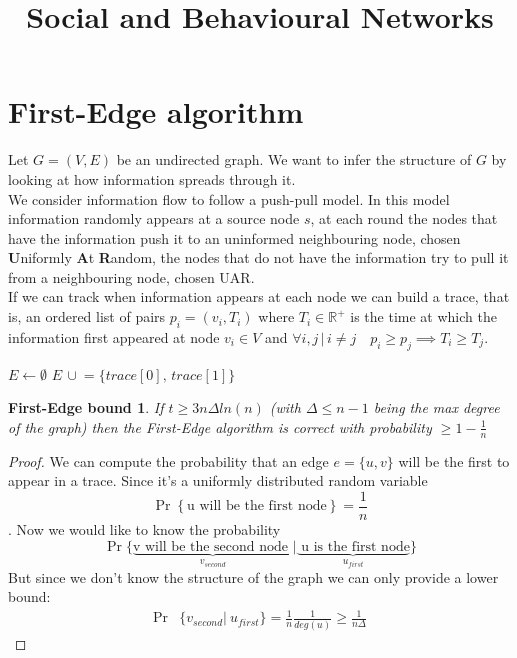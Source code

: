 \documentclass[]{article}
\title{Social and Behavioural Networks}
\author{}
\begin{document}
\maketitle
\tableofcontents

\clearpage

\section{First-Edge algorithm}
Let $G = (V, E)$ be an undirected graph. We want to infer the structure of $G$ by looking at how information spreads through it.\\We consider information flow to follow a push-pull model. In this model information randomly appears at a source node $s$, at each round the nodes that have the information push it to an uninformed neighbouring node, chosen \textbf{U}niformly \textbf{A}t \textbf{R}andom, the nodes that do not have the information try to pull it from a neighbouring node, chosen UAR.\\If we can track when information appears at each node we can build a trace, that is, an ordered list of pairs $p_i = (v_i, T_i)$ where $T_i \in \mathbb{R}^+$ is the time at which the information first appeared at node $v_i \in V$ and $\forall i,j \, |\, i\neq j  \quad p_i \geq p_j \implies T_i \geq T_j$.

\begin{algorithm}[H]
	\caption{First-Edge( set of traces: Traces)}
	\label{alg:first-edge}
	\begin{algorithmic}
		\STATE $E \leftarrow \emptyset$
			\STATE $E\, \cup\!= \{trace[0],\, trace[1]\}$
		\ENDFOR
	\end{algorithmic}
\end{algorithm}

\newtheorem*{FirstEdgeBound}{First-Edge bound}
\begin{FirstEdgeBound}
	If $t\geq3n\Delta ln(n)$ (with $\Delta \leq n-1$ being the max degree of the graph) then the First-Edge algorithm is correct with probability $\geq 1-\frac{1}{n}$
\end{FirstEdgeBound}

\begin{proof}
	We can compute the probability that an edge $e = \{u, v\}$ will be the first to appear in a trace. Since it's a uniformly distributed random variable \[\Pr\left\{\text{u will be the first node}\right\} = \frac{1}{n}\]. Now we would like to know the probability 
	\[\Pr\{\underbrace{\text{v will be the second node }}_{v_{second}} | \underbrace{\text{ u is the first node} }_{u_{first}}\}\] 
	But since we don't know the structure of the graph we can only provide a lower bound:
	\begin{align*}
		\Pr&\{v_{second} |\ u_{first} \} = \frac{1}{n} \frac{1}{deg(u)} \geq \frac{1}{n\Delta}
	\end{align*}

\end{proof}
\end{document}
